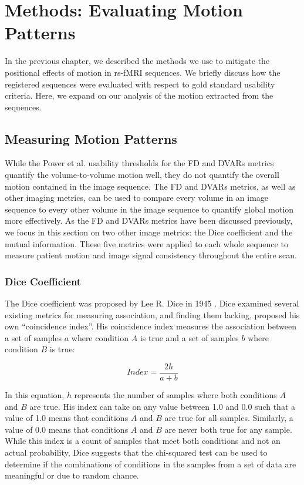 \chapter{Methods: Evaluating Motion Patterns}
\label{ch:mopa}

In the previous chapter, we described the methods we use to mitigate the positional effects of motion in rs-fMRI sequences. We briefly discuss how the registered sequences were evaluated with respect to gold standard usability criteria. Here, we expand on our analysis of the motion extracted from the sequences.

\section{Measuring Motion Patterns}

While the Power et al. usability thresholds for the FD and DVARs metrics quantify the volume-to-volume motion well, they do not quantify the overall motion contained in the image sequence. The FD and DVARs metrics, as well as other imaging metrics, can be used to compare every volume in an image sequence to every other volume in the image sequence to quantify global motion more effectively. As the FD and DVARs metrics have been discussed previously, we focus in this section on two other image metrics: the Dice coefficient and the mutual information. These five metrics were applied to each whole sequence to measure patient motion and image signal consistency throughout the entire scan.

\subsection{Dice Coefficient}

The Dice coefficient was proposed by Lee R. Dice in 1945 \cite{Dice1945}. Dice examined several existing metrics for measuring association, and finding them lacking, proposed his own ``coincidence index''. His coincidence index measures the association between a set of samples $a$ where condition $A$ is true and a set of samples $b$ where condition $B$ is true:

\begin{equation}
Index = \frac{2h}{a+b}
\end{equation}

In this equation, $h$ represents the number of samples where both conditions $A$ and $B$ are true. His index can take on any value between 1.0 and 0.0 such that a value of 1.0 means that conditions $A$ and $B$ are true for all samples. Similarly, a value of 0.0 means that conditions $A$ and $B$ are never both true for any sample. While this index is a count of samples that meet both conditions and not an actual probability, Dice suggests that the chi-squared test can be used to determine if the combinations of conditions in the samples from a set of data are meaningful or due to random chance. 

